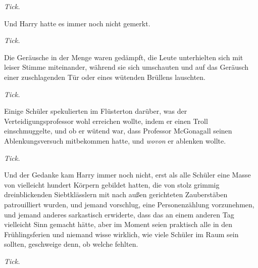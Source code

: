 \emph{Tick.}

Und Harry hatte es immer noch nicht gemerkt.

\emph{Tick.}

Die Geräusche in der Menge waren gedämpft, die Leute unterhielten sich mit leiser Stimme miteinander, während sie sich umschauten und auf das Geräusch einer zuschlagenden Tür oder eines wütenden Brüllens lauschten.

\emph{Tick.}

Einige Schüler spekulierten im Flüsterton darüber, was der Verteidigungsprofessor wohl erreichen wollte, indem er einen Troll einschmuggelte, und ob er wütend war, dass Professor McGonagall seinen Ablenkungsversuch mitbekommen hatte, und \emph{wovon} er ablenken wollte.

\emph{Tick.}

Und der Gedanke kam Harry immer noch nicht, erst als alle Schüler eine Masse von vielleicht hundert Körpern gebildet hatten, die von stolz grimmig dreinblickenden Siebtklässlern mit nach außen gerichteten Zauberstäben patrouilliert wurden, und jemand vorschlug, eine Personenzählung vorzunehmen, und jemand anderes sarkastisch erwiderte, dass das an einem anderen Tag vielleicht Sinn gemacht hätte, aber im Moment seien praktisch alle in den Frühlingsferien und niemand wisse wirklich, wie viele Schüler im Raum sein sollten, geschweige denn, ob welche fehlten.

\emph{Tick.}


